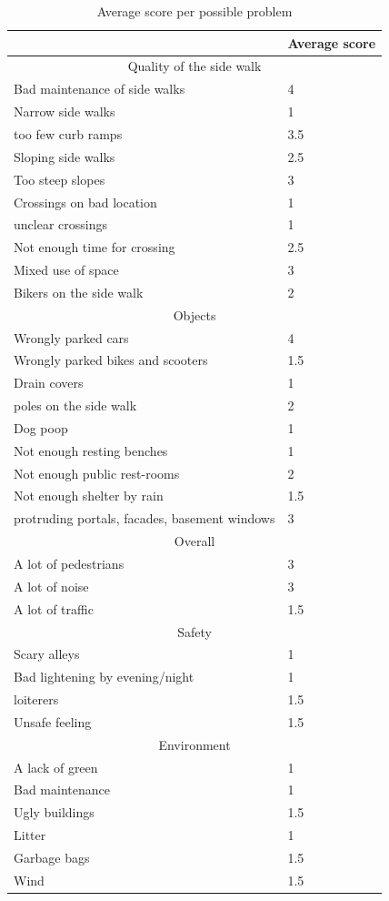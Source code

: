 \begin{appendix}
\begin{table}[ht]
\caption{Average score per possible problem \label{obstacles}}
\begin{tabular}{|l|l|}
	\hline
	 & Average score \\
	\hline
	\multicolumn{2}{|c|}{Quality of the side walk} \\
	\hline
	Bad maintenance of side walks & 4 \\
	Narrow side walks & 1 \\
	too few curb ramps & 3.5 \\
	Sloping side walks & 2.5  \\
	Too steep slopes & 3 \\
	Crossings on bad location & 1 \\
	unclear crossings & 1 \\
	Not enough time for crossing & 2.5 \\
	Mixed use of space & 3 \\
	Bikers on the side walk & 2 \\
	\hline
	\multicolumn{2}{|c|}{Objects} \\
	\hline
	Wrongly parked cars & 4 \\
	Wrongly parked bikes and scooters & 1.5 \\
	Drain covers & 1 \\
	poles on the side walk & 2 \\
	Dog poop & 1 \\
	Not enough resting benches & 1 \\
	Not enough public rest-rooms & 2 \\
	Not enough shelter by rain & 1.5 \\
	protruding portals, facades, basement windows & 3 \\
	\hline
	\multicolumn{2}{|c|}{Overall} \\
	\hline   
	A lot of pedestrians & 3 \\
	A lot of noise & 3 \\
	A lot of traffic & 1.5 \\
	\hline
	\multicolumn{2}{|c|}{Safety} \\
	\hline
	Scary alleys & 1 \\
	Bad lightening by evening/night & 1 \\
	loiterers & 1.5 \\
	Unsafe feeling & 1.5 \\
	\hline
	\multicolumn{2}{|c|}{Environment} \\
	\hline 
	A lack of green & 1 \\
	Bad maintenance & 1 \\
	Ugly buildings & 1.5 \\
	Litter & 1 \\
	Garbage bags & 1.5 \\
	Wind & 1.5 \\
	\hline
\end{tabular}
\end{table}


\end{appendix}
